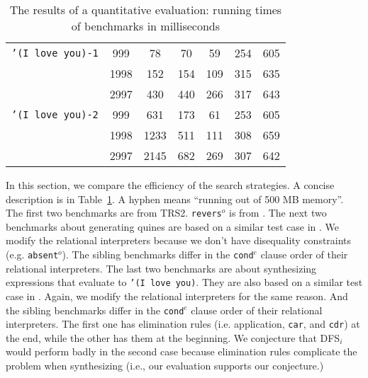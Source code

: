 \documentclass[acmlarge, review=true]{acmart}
\newcommand{\conde}{\texttt{cond$^e$}}
\newcommand{\reverso}{\texttt{revers$^o$}}
\newcommand{\DFSi }[0]{DFS$_{i}$}
\begin{document}
\begin{table}
\begin{tabular}{|c|c|c|c|c|c|c|}
\texttt{'(I love you)-1}&  999 &  78 &  70 &  59 & 254 & 605 \\
						& 1998 & 152 & 154 & 109 & 315 & 635 \\
						& 2997 & 430 & 440 & 266 & 317 & 643 \\
		\hline
\texttt{'(I love you)-2}&  999 & 631 & 173 &  61 & 253 & 605 \\
						& 1998 &1233 & 511 & 111 & 308 & 659 \\
						& 2997 &2145 & 682 & 269 & 307 & 642 \\ 
		\hline 
	\end{tabular}
	\caption{The results of a quantitative evaluation: running times of 
	benchmarks in milliseconds}
	\label{compare-efficiency}
\end{table}

In this section, we compare the efficiency of the search strategies. A concise 
description is in Table~\ref{compare-efficiency}. A hyphen means ``running out
of 500 MB memory''. The first two benchmarks are from 
TRS2. \reverso{} is from 
\citet{rozplokhas2018improving}. 
The next two benchmarks about generating quines are based on a similar test 
case in 
\citet{byrd2017unified}. We modify the relational interpreters because we don't 
have disequality constraints (e.g. \texttt{absent$^o$}). The sibling 
benchmarks differ in the \conde{} clause order of their relational 
interpreters.
The last two benchmarks are about synthesizing expressions that 
evaluate to \texttt{'(I love you)}. 
They are also based on a similar test case in \mbox{\citet{byrd2017unified}}. 
Again, 
we modify the relational interpreters for the same reason. And the sibling 
benchmarks differ in the \conde{} clause order of their relational 
interpreters. The first one has elimination rules (i.e. application, 
\texttt{car}, and \texttt{cdr}) at the end, while the other has them at the 
beginning. We conjecture that \DFSi{} would perform badly in the second case 
because elimination rules complicate the problem when synthesizing (i.e., our 
evaluation supports our conjecture.)
\end{document}
